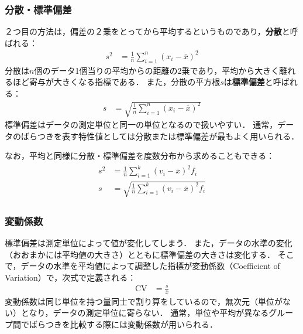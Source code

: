 \subsubsection*{分散・標準偏差}
%
２つ目の方法は，偏差の２乗をとってから平均するというものであり，\textbf{分散}と呼ばれる：
%
\begin{align}
	s^{2} &= \frac{1}{n} \sum_{i=1}^{n} (x_{i} - \bar{x})^{2}
	\label{eq:deviation}
\end{align}
%
分散は$ n $個のデータ1個当りの平均からの距離の2乗であり，平均から大きく離れるほど寄与が大きくなる指標である．
%
%
また，分散の平方根$ s $は\textbf{標準偏差}と呼ばれる：
%
\begin{align}
	s &= \sqrt{\frac{1}{n} \sum_{i=1}^{n} (x_{i} - \bar{x})^{2}}
	\label{eq:standard_deviation}
\end{align}
%
標準偏差はデータの測定単位と同一の単位となるので扱いやすい．
%
通常，データのばらつきを表す特性値としては分散または標準偏差が最もよく用いられる．
%

%
なお，平均と同様に分散・標準偏差を度数分布から求めることもできる：
%
\begin{align}
	\begin{split}
	s^{2} &= \frac{1}{n} \sum_{i=1}^{k} (v_{i} - \bar{x})^{2} f_{i} \\
	s &= \sqrt{\frac{1}{n} \sum_{i=1}^{k} (v_{i} - \bar{x})^{2} f_{i}}
	\end{split}
	\label{eq:deviation2}
\end{align}
%

\subsubsection*{変動係数}
%
標準偏差は測定単位によって値が変化してしまう．
%
また，データの水準の変化（おおまかには平均値の大きさ）とともに標準偏差の大きさは変化する．
%
そこで，データの水準を平均値によって調整した指標が変動係数（Coefficient of Variation）で，次式で定義される：
%
\begin{align}
	\mathrm{CV} &= \frac{s}{\bar{x}}
	\label{eq:cv}
\end{align}
%
変動係数は同じ単位を持つ量同士で割り算をしているので，無次元（単位がない）となり，データの測定単位に寄らない．
%
通常，単位や平均が異なるグループ間でばらつきを比較する際には変動係数が用いられる．
%

